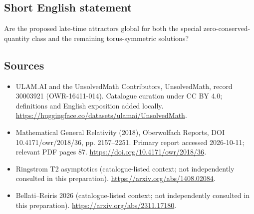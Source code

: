 \documentclass[11pt]{article}
\begin{document}
\subsection{Short English statement}
Are the proposed late-time attractors global for both the special zero-conserved-quantity class and the remaining torus-symmetric solutions?
\subsection{Sources}
\begin{itemize}
\item[\hypertarget{source:30003921:1}{S1}] ULAM.AI and the UnsolvedMath Contributors, UnsolvedMath, record 30003921 (OWR-16411-014). Catalogue curation under CC BY 4.0; definitions and English exposition added locally.
\url{https://huggingface.co/datasets/ulamai/UnsolvedMath}.
\item[\hypertarget{source:30003921:2}{S2}] Mathematical General Relativity (2018), Oberwolfach Reports, DOI 10.4171/owr/2018/36, pp. 2157--2251. Primary report accessed 2026-10-11; relevant PDF pages 87.
\url{https://doi.org/10.4171/owr/2018/36}.
\item[\hypertarget{source:30003921:3}{S3}] Ringstrom T2 asymptotics (catalogue-listed context; not independently consulted in this preparation).
\url{https://arxiv.org/abs/1408.02084}.
\item[\hypertarget{source:30003921:4}{S4}] Bellati--Reiris 2026 (catalogue-listed context; not independently consulted in this preparation).
\url{https://arxiv.org/abs/2311.17180}.
\end{itemize}
\label{end:30003921}
\end{document}

